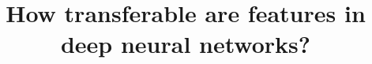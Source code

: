\documentclass{article} %
\title{How transferable are features in deep neural networks?}
\begin{document}
\maketitle

\thispagestyle{firstpagestyle}

\begin{abstract}

\end{abstract}









{\small
%


}
\end{document}
